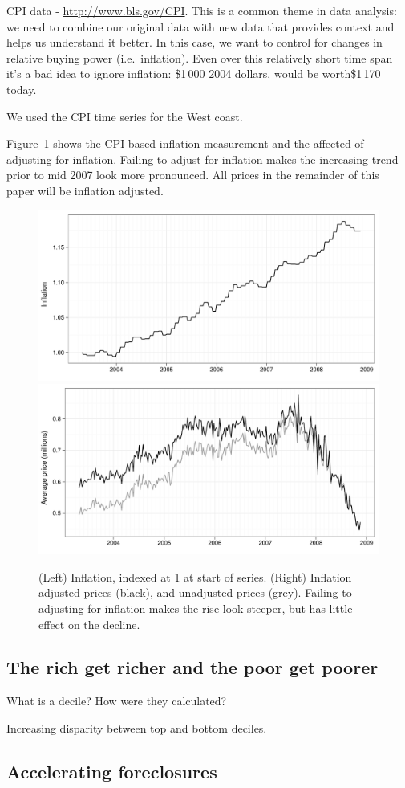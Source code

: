 \documentclass[oneside]{article}
\begin{document}
CPI data - \url{http://www.bls.gov/CPI}.  This is a common theme in data analysis: we need to combine our original data with new data that provides context and helps us understand it better.  In this case, we want to control for changes in relative buying power (i.e.\ inflation).  Even over this relatively short time span it's a bad idea to ignore inflation: \$1\,000 2004 dollars, would be worth\$1\,170 today.

We used the CPI time series for the West coast.

Figure~\ref{fig:inflation} shows the CPI-based inflation measurement and the affected of adjusting for inflation.  Failing to adjust for inflation makes the increasing trend prior to mid 2007 look more pronounced.  All prices in the remainder of this paper will be inflation adjusted.

\begin{figure}[htbp]
  \centering
    \includegraphics[width=0.5 \linewidth]{daily-cpi}%
    \includegraphics[width=0.5 \linewidth]{daily-price-adj}
  \caption{(Left) Inflation, indexed at 1 at start of series.  (Right) Inflation adjusted prices (black), and unadjusted prices (grey).  Failing to adjusting for inflation makes the rise look steeper, but has little effect on the decline.}
  \label{fig:inflation}
\end{figure}

\subsection{The rich get richer and the poor get poorer}

What is a decile?  How were they calculated?

Increasing disparity between top and bottom deciles.

\subsection{Accelerating foreclosures}
\end{document}

